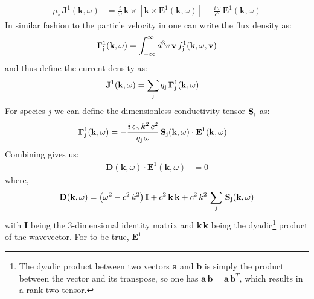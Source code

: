             \begin{align}
                \mu_\circ\,\mathbf{J}^1(\mathbf{k}, \omega) & = \frac{i}{\omega}\,\mathbf{k} \times \left[\mathbf{k} \times \mathbf{E}^1(\mathbf{k}, \omega)\right] + \frac{i\,\omega}{c^2}\,\mathbf{E}^1(\mathbf{k}, \omega) \label{eq:curr3}
            \end{align}
            In similar fashion to the particle velocity in  one can write the flux
            density as:
            \begin{align}
                \Gamma_{\rm j}^1(\mathbf{k}, \omega) = \int_{-\infty}^{\infty}d^3 v\,\mathbf{v}\,\mathnormal{f}_{\rm j}^1(\mathbf{k}, \omega, \mathbf{v}) \label{eq:flux1}
            \end{align}
            and thus define the current density as:
            \begin{align}
                \mathbf{J}^1(\mathbf{k}, \omega) & = \sum_{\rm j} q_{\rm j}\,\mathbf{\Gamma}_{\rm j}^1(\mathbf{k}, \omega) \label{eq:curr4}
            \end{align}
            For species $j$ we can define the dimensionless conductivity tensor $\mathbf{S}_{\rm j}$
            as:
            \begin{align}
                \mathbf{\Gamma}_{\rm j}^1(\mathbf{k}, \omega) & = - \frac{i\,\epsilon_\circ\,k^2\,c^2}{q_{\rm j}\,\omega}\,\mathbf{S}_{\rm j}(\mathbf{k},\omega)\cdot \mathbf{E}^1(\mathbf{k},\omega) \label{eq:curr5}
            \end{align}
            Combining  gives us:
            \begin{align}
                \mathbf{D}(\mathbf{k},\omega)\cdot \mathbf{E}^1(\mathbf{k},\omega) & = 0 \label{eq:disp1}
            \end{align}
            where,
            \begin{align}
                \mathbf{D}(\mathbf{k},\omega) = \left(\omega^2 - c^2\,k^2\right)\mathbf{I} + c^2\,\mathbf{k}\,\mathbf{k} + c^2\,k^2\,\sum_{\rm j}\,\mathbf{S}_{\rm j}(\mathbf{k},\omega) \label{eq:disp2}
            \end{align}
            with \textbf{I} being the 3-dimensional identity matrix and \textbf{k}\,\textbf{k} being
            the dyadic\footnote{The dyadic product between two vectors \textbf{a} and \textbf{b} is
            simply the product between the vector and its transpose, so one has
            $\mathbf{a}\,\mathbf{b} = \mathbf{a}\,\mathbf{b}^T$, which results in a rank-two
            tensor.} product of the wavevector. For  to be true, $\mathbf{E}^1$
